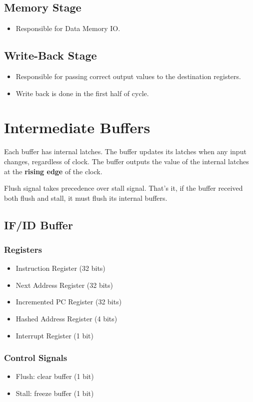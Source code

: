 \subsection{Memory Stage}
\begin{itemize}
    \item Responsible for Data Memory IO.
\end{itemize}

\subsection{Write-Back Stage}
\begin{itemize}
    \item Responsible for passing correct output values to the destination registers.
    \item Write back is done in the first half of cycle.
\end{itemize}

\section{Intermediate Buffers}
Each buffer has internal latches. 
The buffer updates its latches when any input changes, regardless of clock. 
The buffer outputs the value of the internal latches at the \textbf{rising edge} of the clock.

Flush signal takes precedence over stall signal. That's it, if the buffer received both flush and stall, it must flush its internal buffers.
\subsection{IF/ID Buffer}
\subsubsection{Registers}
\begin{itemize}
    \item Instruction Register (32 bits)
    \item Next Address Register (32 bits)
    \item Incremented PC Register (32 bits)
    \item Hashed Address Register (4 bits)
    \item Interrupt Register (1 bit)
\end{itemize}

\subsubsection{Control Signals}
\begin{itemize}
    \item Flush: clear buffer (1 bit)
    \item Stall: freeze buffer (1 bit)
\end{itemize}

